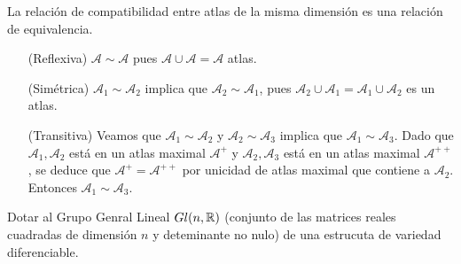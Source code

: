 \documentclass[twoside]{report}
\newcommand {\At} {{\mathcal{A}}}
\begin{document}
\begin{prop}
La relación de compatibilidad entre atlas de la misma dimensión es una relación de equivalencia.
\end{prop}

\begin{dem}\mbox{}
\begin{itemize}
	\item[(Reflexiva)] $\At \sim \At$ pues $\At \cup \At = \At$ atlas.
	\item[(Simétrica)] $\At_1 \sim \At_2$ implica que $\At_2 \sim \At_1$, pues $\At_2 \cup \At_1 = \At_1 \cup \At_2$ es un atlas.
	\item[(Transitiva)] Veamos que $\At_1 \sim \At_2$ y $\At_2 \sim \At_3$ implica que $\At_1 \sim \At_3$. Dado que $\At_1,\At_2$ está en un atlas maximal $\At^+$ y $\At_2,\At_3$ está en un atlas maximal $\At^{++}$, se deduce que $\At^+=\At^{++}$ por unicidad de atlas maximal que contiene a $\At_2$. Entonces $\At_1 \sim \At_3$.
\end{itemize}
\end{dem}


\begin{ejer}
Dotar al Grupo Genral Lineal $Gl(n,\mathbb{R})$ (conjunto de las matrices reales cuadradas de dimensión $n$ y deteminante no nulo) de una estrucuta de variedad diferenciable.
\end{ejer}
\end{document}

